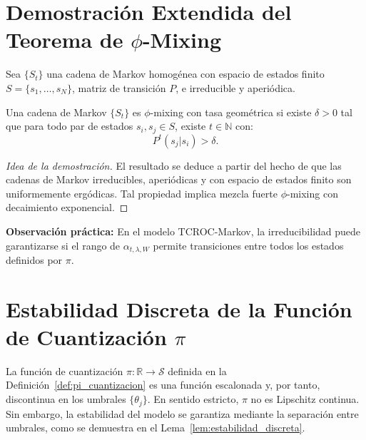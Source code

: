 \begin{appendices}
\renewcommand{\thesection}{A\arabic{section}}
\renewcommand{\thesubsection}{A\arabic{section}.\arabic{subsection}}
\renewcommand{\thefigure}{A\arabic{figure}}
\renewcommand{\thetable}{A\arabic{table}}

\section{Demostración Extendida del Teorema de \texorpdfstring{$\phi$}{phi}-Mixing}
\label{apx:teorema_phi_mixing}

Sea \( \{S_t\} \) una cadena de Markov homogénea con espacio de estados finito \( S = \{s_1, \dots, s_N\} \), matriz de transición \( P \), e irreducible y aperiódica.

\begin{theorem}
Una cadena de Markov \( \{S_t\} \) es \( \phi \)-mixing con tasa geométrica si existe \( \delta > 0 \) tal que para todo par de estados \( s_i, s_j \in S \), existe \( t \in \mathbb{N} \) con:
\[ P^t(s_j | s_i) > \delta. \]
\end{theorem}

\begin{proof}[Idea de la demostración]
El resultado se deduce a partir del hecho de que las cadenas de Markov irreducibles, aperiódicas y con espacio de estados finito son uniformemente ergódicas. Tal propiedad implica mezcla fuerte \( \phi \)-mixing con decaimiento exponencial.
\end{proof}

\textbf{Observación práctica:} En el modelo TCROC-Markov, la irreducibilidad puede garantizarse si el rango de \( \alpha_{t,\lambda,W} \) permite transiciones entre todos los estados definidos por \( \pi \).

\section{Estabilidad Discreta de la Función de Cuantización
\texorpdfstring{$\pi$}{pi}}
\label{apx:lipschitz_constante_pi}

La función de cuantización $\pi\colon \mathbb{R} \to \mathcal{S}$
definida en la Definición~\ref{def:pi_cuantizacion} es una función
escalonada y, por tanto, discontinua en los umbrales
$\{\theta_j\}$.  En sentido estricto, $\pi$ no es Lipschitz
continua.  Sin embargo, la estabilidad del modelo se garantiza
mediante la separación entre umbrales, como se demuestra en el
Lema~\ref{lem:estabilidad_discreta}.


\end{appendices}
